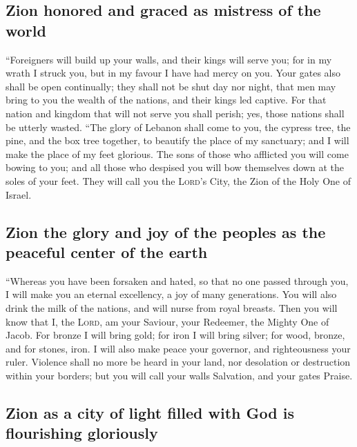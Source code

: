 \hypertarget{zion-honored-and-graced-as-mistress-of-the-world}{%
\subsection{Zion honored and graced as mistress of the
world}\label{zion-honored-and-graced-as-mistress-of-the-world}}

 ``Foreigners will build up your walls, and their kings
will serve you; for in my wrath I struck you, but in my favour I have
had mercy on you.  Your gates also shall be open
continually; they shall not be shut day nor night, that men may bring to
you the wealth of the nations, and their kings led captive.
 For that nation and kingdom that will not serve you
shall perish; yes, those nations shall be utterly wasted.
 ``The glory of Lebanon shall come to you, the cypress
tree, the pine, and the box tree together, to beautify the place of my
sanctuary; and I will make the place of my feet glorious.
 The sons of those who afflicted you will come bowing to
you; and all those who despised you will bow themselves down at the
soles of your feet. They will call you the \textsc{Lord}'s City, the
Zion of the Holy One of Israel.

\hypertarget{zion-the-glory-and-joy-of-the-peoples-as-the-peaceful-center-of-the-earth}{%
\subsection{Zion the glory and joy of the peoples as the peaceful center
of the
earth}\label{zion-the-glory-and-joy-of-the-peoples-as-the-peaceful-center-of-the-earth}}

 ``Whereas you have been forsaken and hated, so that no
one passed through you, I will make you an eternal excellency, a joy of
many generations.  You will also drink the milk of the
nations, and will nurse from royal breasts. Then you will know that I,
the \textsc{Lord}, am your Saviour, your Redeemer, the Mighty One of
Jacob.  For bronze I will bring gold; for iron I will
bring silver; for wood, bronze, and for stones, iron. I will also make
peace your governor, and righteousness your ruler. 
Violence shall no more be heard in your land, nor desolation or
destruction within your borders; but you will call your walls Salvation,
and your gates Praise.

\hypertarget{zion-as-a-city-of-light-filled-with-god-is-flourishing-gloriously}{%
\subsection{Zion as a city of light filled with God is flourishing
gloriously}\label{zion-as-a-city-of-light-filled-with-god-is-flourishing-gloriously}}

